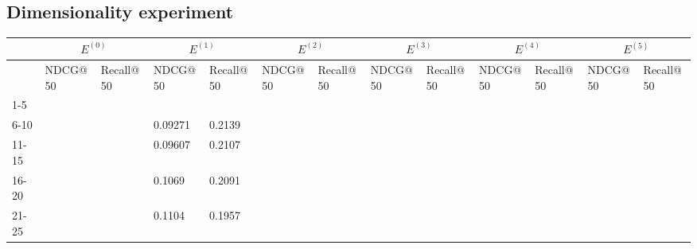 \subsection{Dimensionality experiment}

\begin{table*}[]
    \centering
    \begin{tabular}{|l|l|l|l|l|l|l|l|l|l|l|l|l|}
        \hline
                & \multicolumn{2}{c|}{$E^{(0)}$} & \multicolumn{2}{c|}{$E^{(1)}$} & \multicolumn{2}{c|}{$E^{(2)}$} & \multicolumn{2}{c|}{$E^{(3)}$} & \multicolumn{2}{c|}{$E^{(4)}$} & \multicolumn{2}{c|}{$E^{(5)}$}                                                                   \\ \hline
                & NDCG@50                        & Recall@50                      & NDCG@50                        & Recall@50                      & NDCG@50                        & Recall@50                      & NDCG@50 & Recall@50 & NDCG@50 & Recall@50 & NDCG@50 & Recall@50 \\ \hline
        1-5     &                                &                                &                                &                                &                                &                                &         &           &         &           &         &           \\ \hline
        6-10    &                                &                                & 0.09271                        & 0.2139                         &                                &                                &         &           &         &           &         &           \\ \hline
        11-15   &                                &                                & 0.09607                        & 0.2107                         &                                &                                &         &           &         &           &         &           \\ \hline
        16-20   &                                &                                & 0.1069                         & 0.2091                         &                                &                                &         &           &         &           &         &           \\ \hline
        21-25   &                                &                                & 0.1104                         & 0.1957                         &                                &                                &         &           &         &           &         &           \\ \hline

\end{tabular}
\end{table*}
